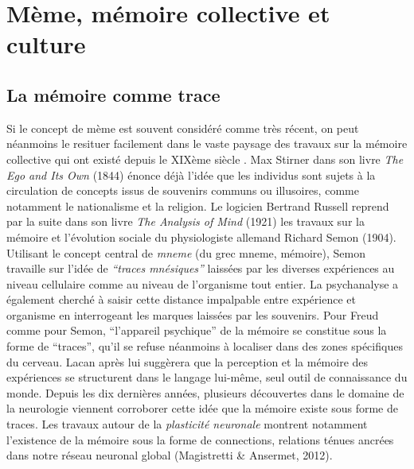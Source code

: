 \section[M\`eme, m\'emoire collective et culture]{M\`eme, m\'emoire collective et culture}
\subsection[La m\'emoire comme trace]{La m\'emoire comme trace}

Si le concept de m\`eme est souvent consid\'er\'e comme tr\`es r\'ecent, on peut n\'eanmoins le resituer facilement dans le vaste paysage des travaux sur la m\'emoire collective qui ont exist\'e depuis le XIX\`eme si\`ecle \citep{Laurent1999}. Max Stirner dans son livre \textit{The Ego and Its Own }(1844) \'enonce d\'ej\`a l{\textquoteright}id\'ee que les individus sont sujets \`a la circulation de concepts issus de souvenirs communs ou illusoires, comme notamment le nationalisme et la religion. Le logicien Bertrand Russell reprend par la suite dans son livre \textit{The Analysis of Mind }(1921) les travaux sur la m\'emoire et l{\textquoteright}\'evolution sociale du physiologiste allemand Richard Semon (1904). Utilisant le concept central de \textit{mneme} (du grec 
mneme, m\'emoire), Semon travaille sur l{\textquoteright}id\'ee de \textit{{\textquotedblleft}traces mn\'esiques{\textquotedblright} }laiss\'ees par les diverses exp\'eriences au niveau cellulaire comme au niveau de l{\textquoteright}organisme tout entier. La psychanalyse a \'egalement cherch\'e \`a saisir cette distance impalpable entre exp\'erience et organisme en interrogeant les marques laiss\'ees par les souvenirs. Pour Freud comme pour Semon, {\textquotedblleft}l{\textquoteright}appareil psychique{\textquotedblright} de la m\'emoire se constitue sous la forme de {\textquotedblleft}traces{\textquotedblright}, qu{\textquoteright}il se refuse n\'eanmoins \`a localiser dans des zones sp\'ecifiques du cerveau. Lacan apr\`es lui sugg\`erera que la perception et la m\'emoire des exp\'eriences se structurent dans le langage lui-m\^eme, seul outil de connaissance du monde. Depuis les dix derni\`eres ann\'ees, plusieurs d\'ecouvertes dans le domaine de la neurologie viennent corroborer cette id\'ee que la m\'emoire existe sous forme de traces. Les travaux autour de la \textit{plasticit\'e neuronale }montrent notamment l{\textquoteright}existence de la m\'emoire sous la forme de connections, relations t\'enues ancr\'ees dans notre r\'eseau neuronal global (Magistretti \& Ansermet, 2012).  

